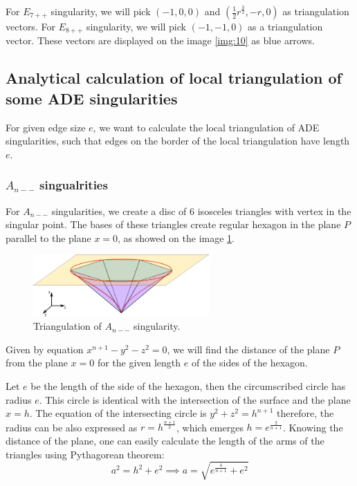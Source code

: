 For $E_{7++}$ singularity, we will pick $(-1, 0, 0)$ and 
$(\frac{1}{2}r^{\frac{3}{2}}, -r, 0)$ as triangulation vectors.
For $E_{8++}$ singularity, we will pick $(-1, -1, 0)$ as a triangulation vector.
These vectors are displayed on the image \ref{img:10} as blue arrows.

\subsection*{Analytical calculation of local triangulation of some ADE singularities}
For given edge size $e$, we want to calculate the local triangulation of ADE
singularities, such that edges on the border of the local triangulation
have length $e$.
\subsubsection*{$A_{n--}$ singualrities}
For $A_{n--}$ singularities, we create a disc of $6$ isosceles triangles
with vertex in the singular point. The bases of these triangles create regular
hexagon in the plane $P$ parallel to the plane $x=0$, as showed on the image
\ref{img:11}.
\begin{figure}
    \centerline{\includegraphics[width=0.6\textwidth]{images/img11}}
    \caption[Triangulation of $A_{n--}$ singularity.]
    {Triangulation of $A_{n--}$ singularity.}
    \label{img:11}
\end{figure}
Given by equation $x^{n+1}-y^2-z^2=0$, we will find the distance of the 
plane $P$ from the plane $x=0$ for the given length $e$ of the sides of
the hexagon.

Let $e$ be the length of the side of the hexagon, then the circumscribed
circle has radius $e$. This circle is identical with the intersection of
the surface and the plane $x=h$. The equation of the intersecting circle
is $y^2+z^2=h^{n+1}$ therefore, the radius can be also expressed as 
$r=h^{\frac{n+1}{2}}$, which emerges $h=e^{\frac{2}{n+1}}$. Knowing the
distance of the plane, one can easily calculate the length of the arms of
the triangles using Pythagorean theorem: 
$$a^2=h^2+e^2 \implies a = \sqrt{e^{\frac{4}{n+1}} + e^2}$$

